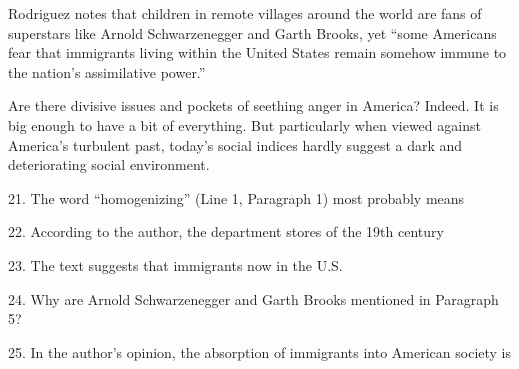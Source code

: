 \qquad Rodriguez notes that children in remote villages around the world are fans of superstars like Arnold Schwarzenegger and Garth Brooks, yet ``some Americans fear that immigrants living within the United States remain somehow immune to the nation's assimilative power.''

\qquad Are there divisive issues and pockets of seething anger in America? Indeed. It is big enough to have a bit of everything. But particularly when viewed against America's turbulent past, today's social indices hardly suggest a dark and deteriorating social environment.

\vspace{6pt}

21. The word ``homogenizing'' (Line 1, Paragraph 1) most probably means\par

22. According to the author, the department stores of the 19th century\par

23. The text suggests that immigrants now in the U.S.\par

24. Why are Arnold Schwarzenegger and Garth Brooks mentioned in Paragraph 5?\par

25. In the author's opinion, the absorption of immigrants into American society is\par

